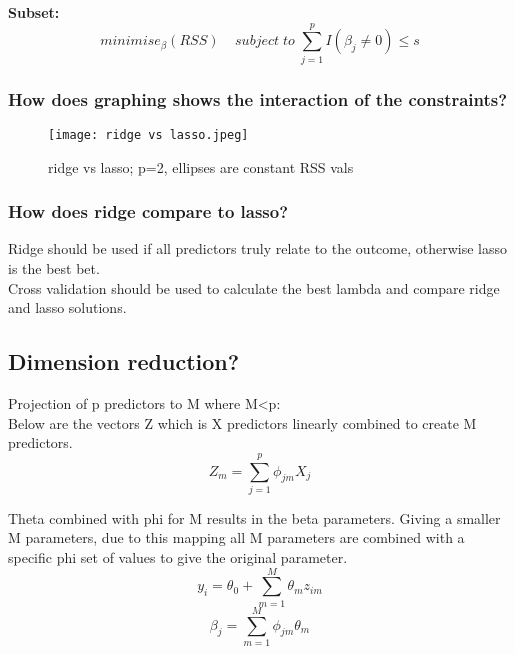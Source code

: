 \documentclass[11pt]{scrartcl} %
\begin{document}
\textbf{Subset:}
\begin{equation}
	minimise_{\beta}(RSS)\;\;\;\; subject\; to\; \sum^p_{j=1}{I(\beta_j\neq 0)} \leq s
\end{equation}

\subsubsection{How does graphing shows the interaction of the constraints?}

\begin{figure}[h] %
	\centering
	\texttt{[image: ridge vs lasso.jpeg]} %
	\caption{ridge vs lasso; p=2, ellipses are constant RSS vals}
\end{figure}

\subsubsection{How does ridge compare to lasso?}

Ridge should be used if all predictors truly relate to the outcome, otherwise lasso is the best bet.\\

Cross validation should be used to calculate the best lambda and compare ridge and lasso solutions.

\subsection{Dimension reduction?}

Projection of p predictors to M where M<p:\\

Below are the vectors Z which is X predictors linearly combined to create M predictors.
\begin{equation}
	Z_m = \sum^p_{j=1}{\phi_{jm}X_j}
\end{equation}

Theta combined with phi for M results in the beta parameters. Giving a smaller M parameters, due to this
mapping all M parameters are combined with a specific phi set of values to give the original parameter.
\begin{equation}
	y_i= \theta_0 + \sum^M_{m=1}{\theta_mz_{im}}
\end{equation}
\begin{equation}
	\beta_j = \sum^M_{m=1}{\phi_{jm}\theta_m}
\end{equation}
\end{document}
